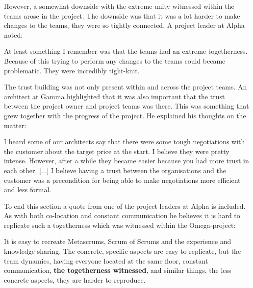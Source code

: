 However, a somewhat downside with the extreme unity witnessed within the teams arose in the project. The downside was that it was a lot harder to make changes to the teams, they were so tightly connected. A project leader at Alpha noted:

\begin{fancyquotes}
At least something I remember was that the teams had an extreme togetherness. Because of this trying to perform any changes to the teams could became problematic. They were incredibly tight-knit.
\end{fancyquotes}

The trust building was not only present within and across the project teams. An architect at Gamma highlighted that it was also important that the trust between the project owner and project teams was there. This was something that grew together with the progress of the project. He explained his thoughts on the matter:

\begin{fancyquotes}
I heard some of our architects say that there were some tough negotiations with the customer about the target price at the start. I believe they were pretty intense. However, after a while they became easier because you had more trust in each other. [...] I believe having a trust between the organisations and the customer was a precondition for being able to make negotiations more efficient and less formal.
\end{fancyquotes}

To end this section a quote from one of the project leaders at Alpha is included. As with both co-location and constant communication he believes it is hard to replicate such a togetherness which was witnessed within the Omega-project:

\begin{fancyquotes}
It is easy to recreate Metascrums, Scrum of Scrums and the experience and knowledge sharing. The concrete, specific aspects are easy to replicate, but the team dynamics, having everyone located at the same floor, constant communication, \textbf{the togetherness witnessed}, and similar things, the less concrete aspects, they are harder to reproduce.
\end{fancyquotes}